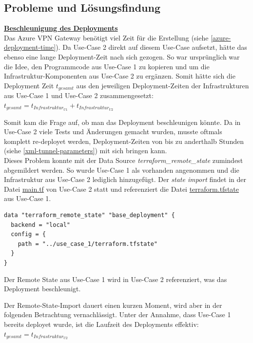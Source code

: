 \subsection{Probleme und Lösungsfindung}

\textbf{\underline{Beschleunigung des Deployments}}\\
Das Azure VPN Gateway benötigt viel Zeit für die Erstellung (siehe \ref{azure-deployment-time}). Da Use-Case 2 direkt auf diesem Use-Case aufsetzt, hätte das ebenso eine lange Deployment-Zeit nach sich gezogen. So war ursprünglich war die Idee, den Programmcode aus Use-Case 1 zu kopieren und um die Infrastruktur-Komponenten aus Use-Case 2 zu ergänzen. Somit hätte sich die Deployment Zeit $t_{gesamt}$ aus den jeweiligen Deployment-Zeiten der Infrastrukturen aus Use-Case 1 und Use-Case 2 zusammengesetzt:\\
$t_{gesamt} = t_{Infrastruktur_{U1}} + t_{Infrastruktur_{U2}}$

Somit kam die Frage auf, ob man das Deployment beschleunigen könnte. Da in Use-Case 2 viele Tests und Änderungen gemacht wurden, musste oftmals komplett re-deployet werden, Deployment-Zeiten von bis zu anderthalb Stunden (siehe \ref{xml-tunnel-parameters}) mit sich bringen kann.\\
Dieses Problem konnte mit der Data Source \textit{terraform\_remote\_state} zumindest abgemildert werden\cite{remotestateimport2021}. So wurde Use-Case 1 als vorhanden angenommen und die Infrastruktur aus Use-Case 2 lediglich hinzugefügt. Der \textit{state import} findet in der Datei \underline{main.tf} von Use-Case 2 statt und referenziert die Datei \underline{terraform.tfstate} aus Use-Case 1.
\begin{listing}[h]
\begin{verbatim}
data "terraform_remote_state" "base_deployment" {
  backend = "local"
  config = {
    path = "../use_case_1/terraform.tfstate"
  }
}

\end{verbatim}
\caption{Der Remote State aus Use-Case 1 wird in Use-Case 2 referenziert, was das Deployment beschleunigt.}
\label{tf-remote-state-import}
\end{listing}\FloatBarrier
Der Remote-State-Import dauert einen kurzen Moment, wird aber in der folgenden Betrachtung vernachlässigt.
Unter der Annahme, dass Use-Case 1 bereits deployet wurde, ist die Laufzeit des Deployments effektiv:\\
$t_{gesamt} = t_{Infrastruktur_{U2}}$


